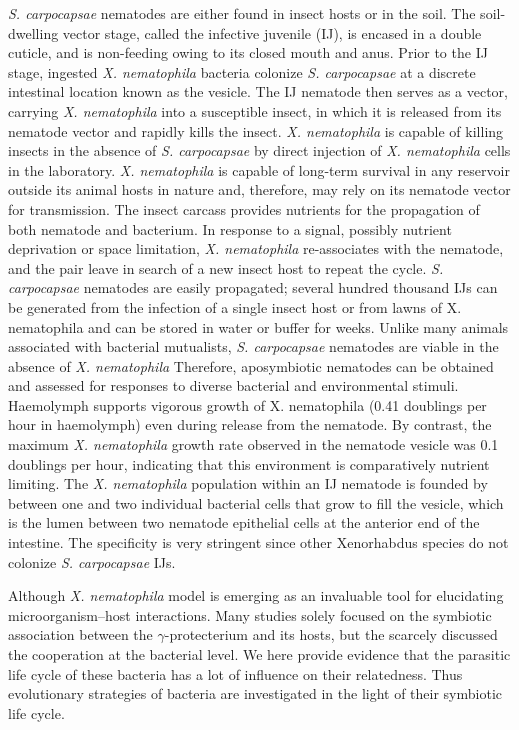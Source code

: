 \documentclass[10pt]{article}
\newcommand{\Xnema}{\textit{X. nematophila} }
\newcommand{\Scarpo}{\textit{S. carpocapsae} }
\begin{document}
\begin{multicols}{2}
\Scarpo nematodes are either found in insect hosts or in the soil. The soil-dwelling vector stage, called the infective juvenile (IJ), is encased in a double cuticle, and is non-feeding owing to its closed mouth and anus.
Prior to the IJ stage, ingested \Xnema bacteria colonize \Scarpo at a discrete intestinal location known as the vesicle. 
The IJ nematode then serves as a vector, carrying \Xnema into a susceptible insect, in which it is released from its nematode vector and rapidly kills the insect. 
\Xnema is capable of killing insects in the absence of \Scarpo by direct injection of \Xnema cells in the laboratory. 
\Xnema is capable of long-term survival in any reservoir outside its animal hosts in nature and, therefore, may rely on its nematode vector for transmission. 
The insect carcass provides nutrients for the propagation of both nematode and bacterium. 
In response to a signal, possibly nutrient deprivation or space limitation, \Xnema re-associates with the nematode, and the pair leave in search of a new insect host to repeat the cycle.
\Scarpo nematodes are easily propagated; several hundred thousand IJs can be generated from the infection of a single insect host or from lawns of X. nematophila and can be stored in water or buffer for weeks. 
Unlike many animals associated with bacterial mutualists, \Scarpo nematodes are viable in the absence of \Xnema Therefore, aposymbiotic nematodes can be obtained and assessed for responses to diverse bacterial and environmental stimuli. 
Haemolymph supports vigorous growth of X. nematophila (0.41 doublings per hour in haemolymph) even during release from the nematode. By contrast, the maximum \Xnema growth rate observed in the nematode vesicle was 0.1 doublings per hour, indicating that this environment is comparatively nutrient limiting.
The \Xnema population within an IJ nematode is founded by between one and two individual bacterial cells that grow to fill the vesicle, which is the lumen between two nematode epithelial cells at the anterior end of the intestine\cite{Martens}. The specificity is very stringent since other Xenorhabdus species do not colonize \Scarpo IJs.

Although \Xnema model is emerging as an invaluable tool for elucidating microorganism–host interactions. Many studies solely focused on the symbiotic association between the $\gamma$-protecterium and its hosts, but the scarcely discussed the cooperation at the bacterial level. We here provide evidence that the parasitic life cycle of these bacteria has a lot of influence on their relatedness. Thus evolutionary strategies of bacteria are investigated in the light of their symbiotic life cycle.


\end{multicols}
\end{document}
